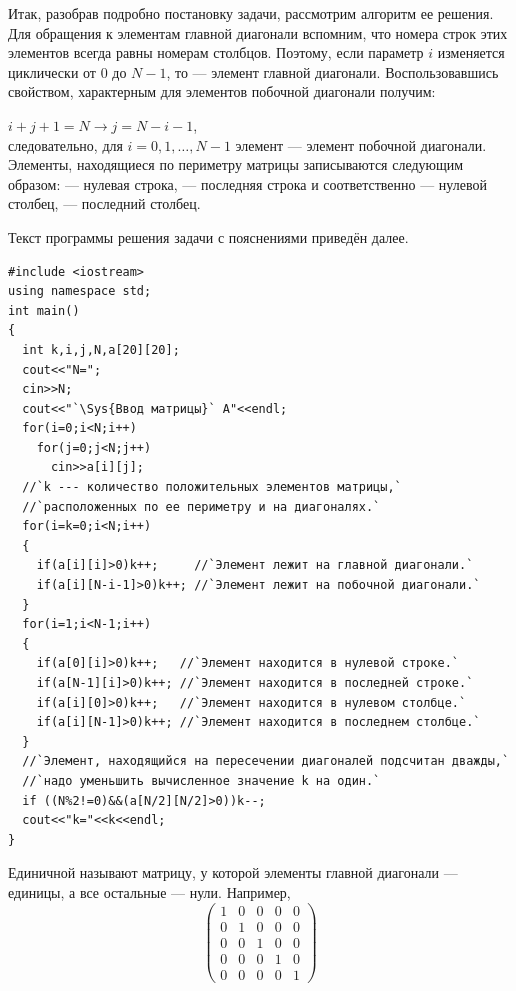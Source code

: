 Итак, разобрав подробно постановку задачи, рассмотрим алгоритм ее решения. Для обращения к элементам главной диагонали
вспомним, что номера строк этих элементов всегда равны номерам столбцов. Поэтому, если параметр $i$ изменяется
циклически от 0 до $N-1$, то  --- элемент главной диагонали. Воспользовавшись
свойством, характерным для элементов побочной диагонали получим:

$i+j+1=N \longrightarrow j=N-i-1$,\\
следовательно, для $i=0,1,\dots,N-1$ элемент  ---
элемент побочной диагонали. Элементы, находящиеся по периметру матрицы записываются 
следующим образом: 
--- нулевая строка,  --- последняя строка и соответственно  --- нулевой столбец,
 --- последний столбец.

Текст программы решения задачи с пояснениями приведён далее.
\begin{lstlisting}
#include <iostream>
using namespace std;
int main()
{
  int k,i,j,N,a[20][20]; 
  cout<<"N=";
  cin>>N;
  cout<<"`\Sys{Ввод матрицы}` A"<<endl;
  for(i=0;i<N;i++)
    for(j=0;j<N;j++)
      cin>>a[i][j];
  //`k --- количество положительных элементов матрицы,`
  //`расположенных по ее периметру и на диагоналях.`
  for(i=k=0;i<N;i++)
  {
    if(a[i][i]>0)k++;     //`Элемент лежит на главной диагонали.`
    if(a[i][N-i-1]>0)k++; //`Элемент лежит на побочной диагонали.`
  }
  for(i=1;i<N-1;i++)
  {
    if(a[0][i]>0)k++;   //`Элемент находится в нулевой строке.`
    if(a[N-1][i]>0)k++; //`Элемент находится в последней строке.`
    if(a[i][0]>0)k++;   //`Элемент находится в нулевом столбце.`
    if(a[i][N-1]>0)k++; //`Элемент находится в последнем столбце.`
  }
  //`Элемент, находящийся на пересечении диагоналей подсчитан дважды,`
  //`надо уменьшить вычисленное значение k на один.` 
  if ((N%2!=0)&&(a[N/2][N/2]>0))k--;
  cout<<"k="<<k<<endl;
}
\end{lstlisting}



Единичной называют матрицу, у которой элементы главной диагонали --- единицы, а все остальные --- нули. Например, 
$$\left(\begin{matrix}1&0&0&0&0\\0&1&0&0&0\\0&0&1&0&0\\0&0&0&1&0\\0&0&0&0&1\end{matrix}\right)$$

